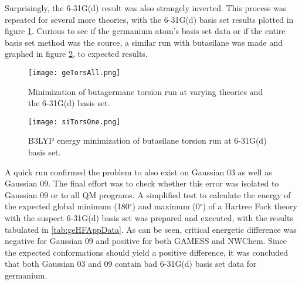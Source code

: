 Surprisingly, the 6-31G(d) result was also strangely inverted.
This process was repeated for several more theories, with the 6-31G(d) basis set results plotted in figure \ref{fig:geTorsAll}.
Curious to see if the germanium atom's basis set data or if the entire basis set method was the source, a similar run with butasilane was made and graphed in figure \ref{fig:siTorsOne}, to expected results.
\begin{figure}
	
	\centering
	
	\texttt{[image: geTorsAll.png]}
	
	\caption{Minimization of butagermane torsion run at varying theories and the 6-31G(d) basis set.}
	
	\label{fig:geTorsAll}
	
\end{figure}
\begin{figure}
	
	\centering
	
	\texttt{[image: siTorsOne.png]}
	
	\caption{B3LYP energy minimization of butasilane torsion run at 6-31G(d) basis set.}
	
	\label{fig:siTorsOne}
	
\end{figure}
A quick run confirmed the problem to also exist on Gaussian 03 as well as Gaussian 09.
The final effort was to check whether this error was isolated to Gaussian 09 or to all QM programs. 
A simplified test to calculate the energy of the expected global minimum (180$^{\circ}$) and maximum (0$^{\circ}$) of a Hartree Fock theory with the suspect 6-31G(d) basis set was prepared and executed, with the results tabulated in \ref{tab:geHFAppData}.
As can be seen, critical energetic difference was negative for Gaussian 09 and positive for both GAMESS and NWChem.
Since the expected conformations should yield a positive difference, it was concluded that both Gaussian 03 and 09 contain bad 6-31G(d) basis set data for germanium.

